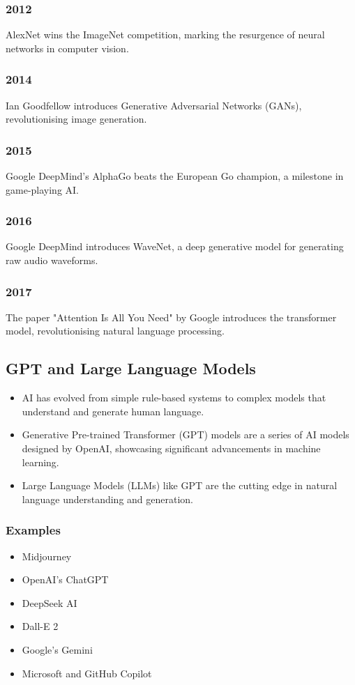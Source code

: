 \documentclass[11pt]{article}
\begin{document}
\subsubsection{2012}
\label{sec:org1335745}
AlexNet wins the ImageNet competition, marking the resurgence of neural networks in computer vision.
\subsubsection{2014}
\label{sec:orgc552303}
Ian Goodfellow introduces Generative Adversarial Networks (GANs), revolutionising image generation.
\subsubsection{2015}
\label{sec:orgfaff8f0}
Google DeepMind's AlphaGo beats the European Go champion, a milestone in game-playing AI.
\subsubsection{2016}
\label{sec:orga57a46e}
Google DeepMind introduces WaveNet, a deep generative model for generating raw audio waveforms.
\subsubsection{2017}
\label{sec:orgb17a876}
The paper "Attention Is All You Need" by Google introduces the transformer model, revolutionising natural language processing.
\subsection{GPT and Large Language Models}
\label{sec:org816dd1d}
\begin{itemize}
\item AI has evolved from simple rule-based systems to complex models that understand and generate human language.
\item Generative Pre-trained Transformer (GPT) models are a series of AI models designed by OpenAI, showcasing significant advancements in machine learning.
\item Large Language Models (LLMs) like GPT are the cutting edge in natural language understanding and generation.
\end{itemize}
\subsubsection{Examples}
\label{sec:org2752a21}
\begin{itemize}
\item Midjourney
\item OpenAI's ChatGPT
\item DeepSeek AI
\item Dall-E 2
\item Google's Gemini
\item Microsoft and GitHub Copilot
\end{itemize}
\end{document}

